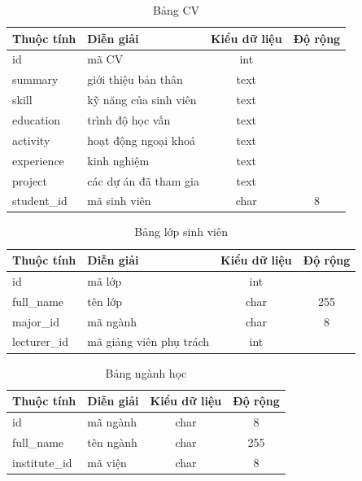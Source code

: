     \begin{table}[h!]
      \centering
      \begin{tabular}{|l|p{}|c|c|}
        \hline
        \textbf{Thuộc tính} & \textbf{Diễn giải} & \textbf{Kiểu dữ liệu} & \textbf{Độ rộng} \\
        \hline
        id & mã CV & int &  \\
        \hline
        summary & giới thiệu bản thân & text & \\
        \hline
        skill & kỹ năng của sinh viên & text &  \\
        \hline
        education & trình độ học vấn & text & \\
        \hline
        activity & hoạt động ngoại khoá & text & \\
        \hline
        experience & kinh nghiệm & text & \\
        \hline
        project & các dự án đã tham gia & text & \\
        \hline
        student\_id & mã sinh viên & char & 8\\
        \hline
      \end{tabular}
      \caption{Bảng CV}
    \end{table}

    \begin{table}[h!]
      \centering
      \begin{tabular}{|l|p{}|c|c|}
        \hline
        \textbf{Thuộc tính} & \textbf{Diễn giải} & \textbf{Kiểu dữ liệu} & \textbf{Độ rộng} \\
        \hline
        id & mã lớp & int &  \\
        \hline
        full\_name & tên lớp & char & 255\\
        \hline
        major\_id & mã ngành & char & 8 \\
        \hline
        lecturer\_id & mã giảng viên phụ trách & int & \\
        \hline
      \end{tabular}
      \caption{Bảng lớp sinh viên}
    \end{table}

    \begin{table}[h!]
      \centering
      \begin{tabular}{|l|p{}|c|c|}
        \hline
        \textbf{Thuộc tính} & \textbf{Diễn giải} & \textbf{Kiểu dữ liệu} & \textbf{Độ rộng} \\
        \hline
        id & mã ngành & char & 8 \\
        \hline
        full\_name & tên ngành & char & 255\\
        \hline
        institute\_id & mã viện & char & 8 \\
        \hline
      \end{tabular}
      \caption{Bảng ngành học}
    \end{table}

